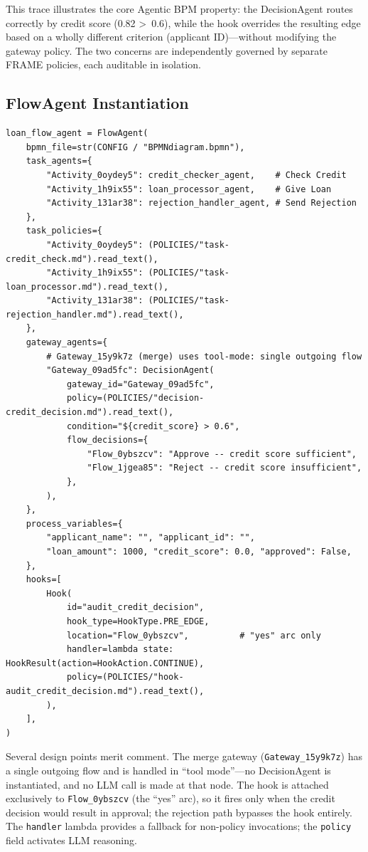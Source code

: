 \documentclass[11pt,a4paper]{article}
\begin{document}
This trace illustrates the core Agentic BPM property: the DecisionAgent routes
correctly by credit score (0.82 \textgreater\ 0.6), while the hook overrides
the resulting edge based on a wholly different criterion (applicant ID)---without
modifying the gateway policy. The two concerns are independently governed by
separate FRAME policies, each auditable in isolation.

\subsection{FlowAgent Instantiation}

\begin{lstlisting}[style=python, caption={Complete FlowAgent instantiation for the loan approval workflow.}]
loan_flow_agent = FlowAgent(
    bpmn_file=str(CONFIG / "BPMNdiagram.bpmn"),
    task_agents={
        "Activity_0oydey5": credit_checker_agent,    # Check Credit
        "Activity_1h9ix55": loan_processor_agent,    # Give Loan
        "Activity_131ar38": rejection_handler_agent, # Send Rejection
    },
    task_policies={
        "Activity_0oydey5": (POLICIES/"task-credit_check.md").read_text(),
        "Activity_1h9ix55": (POLICIES/"task-loan_processor.md").read_text(),
        "Activity_131ar38": (POLICIES/"task-rejection_handler.md").read_text(),
    },
    gateway_agents={
        # Gateway_15y9k7z (merge) uses tool-mode: single outgoing flow
        "Gateway_09ad5fc": DecisionAgent(
            gateway_id="Gateway_09ad5fc",
            policy=(POLICIES/"decision-credit_decision.md").read_text(),
            condition="${credit_score} > 0.6",
            flow_decisions={
                "Flow_0ybszcv": "Approve -- credit score sufficient",
                "Flow_1jgea85": "Reject -- credit score insufficient",
            },
        ),
    },
    process_variables={
        "applicant_name": "", "applicant_id": "",
        "loan_amount": 1000, "credit_score": 0.0, "approved": False,
    },
    hooks=[
        Hook(
            id="audit_credit_decision",
            hook_type=HookType.PRE_EDGE,
            location="Flow_0ybszcv",          # "yes" arc only
            handler=lambda state: HookResult(action=HookAction.CONTINUE),
            policy=(POLICIES/"hook-audit_credit_decision.md").read_text(),
        ),
    ],
)
\end{lstlisting}

Several design points merit comment. The merge gateway
(\texttt{Gateway\_15y9k7z}) has a single outgoing flow and is handled in
``tool mode''---no DecisionAgent is instantiated, and no LLM call is made at
that node. The hook is attached exclusively to \texttt{Flow\_0ybszcv} (the
``yes'' arc), so it fires only when the credit decision would result in approval;
the rejection path bypasses the hook entirely. The \texttt{handler} lambda
provides a fallback for non-policy invocations; the \texttt{policy} field
activates LLM reasoning.
\end{document}
